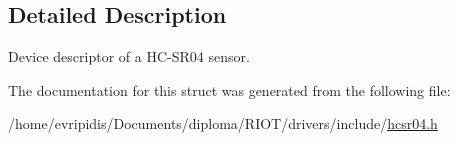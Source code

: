 \subsection{Detailed Description}
Device descriptor of a H\+C-\/\+S\+R04 sensor. 

The documentation for this struct was generated from the following file\+:\begin{DoxyCompactItemize}
\item 
/home/evripidis/\+Documents/diploma/\+R\+I\+O\+T/drivers/include/\hyperlink{hcsr04_8h}{hcsr04.\+h}\end{DoxyCompactItemize}
